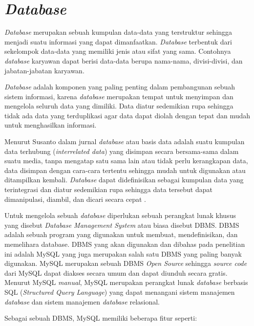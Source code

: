 \section{\textit{Database}}

	\textit{Database} merupakan sebuah kumpulan data-data yang terstruktur sehingga menjadi suatu informasi yang dapat dimanfaatkan. \textit{Database} terbentuk dari sekelompok data-data yang memiliki jenis atau sifat yang sama. Contohnya \textit{database} karyawan dapat berisi data-data berupa nama-nama, divisi-divisi, dan jabatan-jabatan karyawan.


	\textit{Database} adalah komponen yang paling penting dalam pembangunan sebuah sistem informasi, karena \textit{database} merupakan tempat untuk menyimpan dan mengelola seluruh data yang dimiliki. Data diatur sedemikian rupa sehingga tidak ada data yang terduplikasi agar data dapat diolah dengan tepat dan mudah untuk menghasilkan informasi.

	Menurut Susanto dalam jurnal \cite{Sudrajat2014} \textit{database} atau basis data adalah suatu kumpulan data terhubung (\textit{interrelated data}) yang disimpan secara bersama-sama dalam suatu media, tanpa mengatap satu sama lain atau tidak perlu kerangkapan data, data disimpan dengan cara-cara tertentu sehingga mudah untuk digunakan atau ditampilkan kembali. \textit{Database} dapat didefinisikan sebagai kumpulan data yang terintegrasi dan diatur sedemikian rupa sehingga data tersebut dapat dimanipulasi, diambil, dan dicari secara cepat \citep{Raharjo2011}.

	Untuk mengelola sebuah \textit{database} diperlukan sebuah perangkat lunak khusus yang disebut \textit{Database Management System} atau biasa disebut DBMS. DBMS adalah sebuah program yang digunakan untuk membuat, mendefinisikan, dan memelihara database. DBMS yang akan digunakan dan dibahas pada penelitian ini adalah MySQL yang juga merupakan salah satu DBMS yang paling banyak digunakan. MySQL merupakan sebuah DBMS \textit{Open Source} sehingga \textit{source code} dari MySQL dapat diakses secara umum dan dapat diunduh secara gratis. Menurut MySQL \textit{manual}, MySQL merupakan  perangkat lunak \textit{database} berbasis SQL (\textit{Structured Query Language}) yang dapat menangani sistem manajemen \textit{database} dan sistem manajemen \textit{database} relasional.

	Sebagai sebuah DBMS, MySQL memiliki beberapa fitur seperti:

